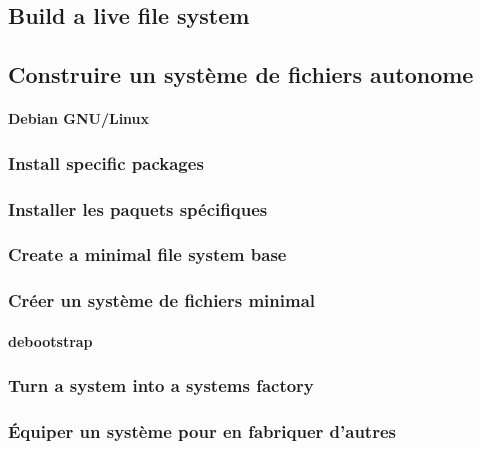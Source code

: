 \ml
{\subsection{Build a live file system}}
{\subsection{Construire un système de fichiers autonome}}

\paragraph{Debian GNU/Linux}

\ml
{\subsubsection{Install specific packages}}
{\subsubsection{Installer les paquets spécifiques}}

\paragraph{}

\paragraph{}

\paragraph{}

\ml
{\subsubsection{Create a minimal file system base}}
{\subsubsection{Créer un système de fichiers minimal}}

\paragraph{debootstrap}

\ml
{\subsubsection{Turn a system into a systems factory}}
{\subsubsection{Équiper un système pour en fabriquer d’autres}}

